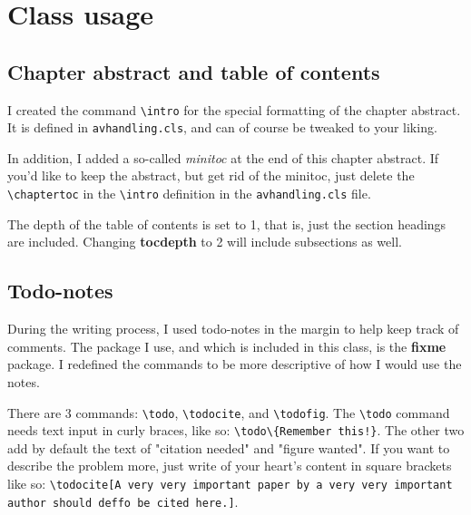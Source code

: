 \chapter{Class usage}


\section{Chapter abstract and table of contents}

I created the command \lstinline{\intro} for the special formatting of the chapter abstract. It is defined in \texttt{avhandling.cls}, and can of course be tweaked to your liking.

In addition, I added a so-called \emph{minitoc} at the end of this chapter abstract.
If you'd like to keep the abstract, but get rid of the minitoc, just delete the \lstinline{\chaptertoc} in the \lstinline{\intro} definition in the \texttt{avhandling.cls} file.

The depth of the table of contents is set to 1, that is, just the section headings are included. Changing \textbf{tocdepth} to 2 will include subsections as well.

\section{Todo-notes}

During the writing process, I used todo-notes in the margin to help keep track of comments\todofig.
The package I use, and which is included in this class, is the \textbf{fixme} package\todocite.
I redefined the commands to be more descriptive of how I would use the notes.

There are 3 commands: \lstinline{\todo}, \lstinline{\todocite}, and \lstinline{\todofig}.
The \lstinline{\todo} command needs text input in curly braces, like so: \lstinline|\todo\{Remember this!}|.
The other two add by default the text of "citation needed" and "figure wanted".
If you want to describe the problem more, just write of your heart's content in square brackets like so: \lstinline{\todocite[A very very important paper by a very very important author should deffo be cited here.]}. 
